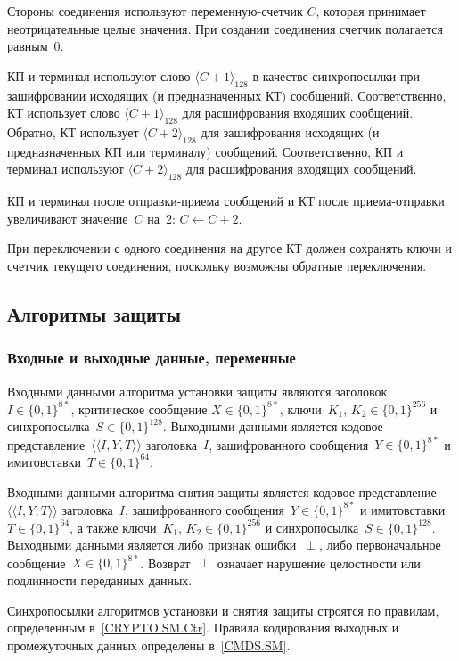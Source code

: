 Стороны соединения используют переменную-счетчик $C$, которая принимает 
неотрицательные целые значения. При создании соединения счетчик 
полагается равным~$0$.

КП и терминал используют слово $\langle C + 1\rangle_{128}$ в качестве 
синхропосылки при зашифровании исходящих (и предназначенных КТ) сообщений. 
Соответственно, КТ использует слово $\langle C + 1\rangle_{128}$ для 
расшифрования входящих сообщений. Обратно, КТ использует 
$\langle C + 2\rangle_{128}$ для зашифрования исходящих (и предназначенных КП 
или терминалу) сообщений. Соответственно, КП и терминал используют 
$\langle C + 2\rangle_{128}$ для расшифрования входящих сообщений. 

КП и терминал после отправки-приема сообщений и КТ после приема-отправки 
увеличивают значение~$C$ на~$2$: $C\gets C + 2$.

При переключении с одного соединения на другое КТ должен сохранять ключи и 
счетчик текущего соединения, поскольку возможны обратные переключения.

\subsection{Алгоритмы защиты}\label{CRYPTO.SM.Algs}

\subsubsection{Входные и выходные данные, переменные}
\label{CRYPTO.SM.Algs.InOut}

Входными данными алгоритма установки защиты являются заголовок~$I\in\{0,1\}^{8*}$, 
критическое сообщение $X \in\{0,1\}^{8*}$, ключи~$K_1$, $K_2\in\{0,1\}^{256}$ 
и синхропосылка~$S\in\{0,1\}^{128}$. Выходными данными является кодовое 
представление~$\langle\langle I, Y, T \rangle\rangle$ заголовка~$I$, 
зашифрованного сообщения~$Y\in\{0,1\}^{8*}$ и имитовставки~$T\in\{0,1\}^{64}$.

Входными данными алгоритма снятия защиты является кодовое представление 
$\langle\langle I,Y,T\rangle\rangle$ заголовка~$I$, зашифрованного 
сообщения~$Y\in\{0,1\}^{8*}$ и имитовставки $T\in\{0,1\}^{64}$, а также 
ключи~$K_1$, $K_2\in\{0,1\}^{256}$ и синхропосылка~$S\in\{0,1\}^{128}$. 
Выходными данными является либо признак ошибки~$\perp$, либо первоначальное 
сообщение~$X\in\{0,1\}^{8*}$. Возврат~$\perp$ означает нарушение целостности 
или подлинности переданных данных.

Синхропосылки алгоритмов установки и снятия защиты строятся по правилам, 
определенным в~\ref{CRYPTO.SM.Ctr}. Правила кодирования выходных и 
промежуточных данных определены в~\ref{CMDS.SM}.

